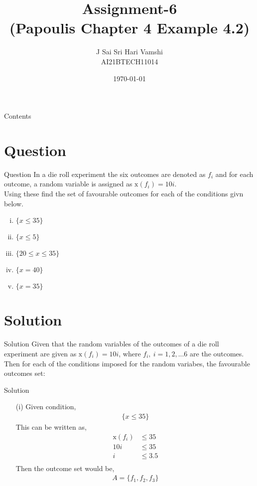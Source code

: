 \documentclass{beamer}
\title{Assignment-6\\(Papoulis Chapter 4 Example 4.2)}
\author{J Sai Sri Hari Vamshi\\ AI21BTECH11014}
\date{\today}
\providecommand{\x}[1]{\ensuremath{\text{x}\left(#1\right)}}
\begin{document}
\begin{frame}
    \titlepage 
\end{frame}



\begin{frame}{Contents}
    \tableofcontents
\end{frame}

\section{Question}
\begin{frame}{Question}
	In a die roll experiment the six outcomes are denoted as $f_i$ and for each outcome, a random variable is assigned as $\x{f_i} = 10i$.\\ Using these find the set of favourable outcomes for each of the conditions givn below.
	\begin{enumerate}[(i)]
	\item $\{x \leq 35\}$
	\item $\{x \leq 5\}$
	\item $\{20 \leq x \leq 35\}$
	\item $\{x = 40\}$
	\item $\{x = 35\}$
	\end{enumerate}
\end{frame}

\section{Solution}

\begin{frame}{Solution}
Given that the random variables of the outcomes of a die roll experiment are given as $\x{f_i} = 10i$, where $f_i,\ i = 1,2,...6$ are the outcomes.\\ Then for each of the conditions imposed for the random variabes, the favourable outcomes set:
\end{frame}

\begin{frame}{Solution}
\begin{enumerate}
\item[(i)] Given condition,
\begin{align*}
\{x \leq 35\}
\end{align*}
This can be written as,
\begin{align*}
\x{f_i} & \leq 35\\
10i & \leq 35\\
i & \leq 3.5\\
\end{align*}
Then the outcome set would be,
\begin{align*}
A = \{f_1, f_2, f_3\}
\end{align*}
\end{enumerate}
\end{frame}
\end{document}
